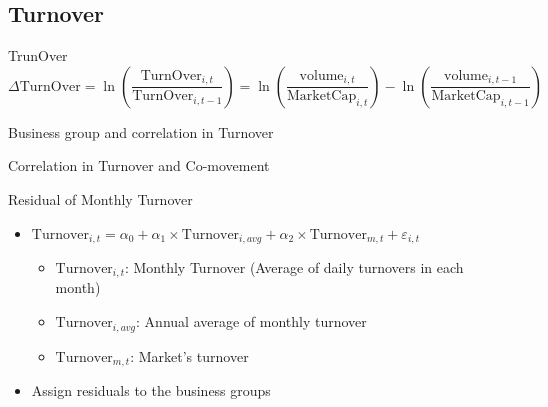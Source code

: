 \documentclass[handout]{beamer}
\begin{document}
 \subsection{Turnover}
	\begin{frame}{TrunOver}{\cite{Liquidity2016}}
		\begin{equation*}
			\Delta \text{TurnOver} = \ln(\frac{\text{TurnOver}_{i,t}}{\text{TurnOver}_{i,t-1}}) = 
			\ln({\frac{\text{volume}_{i,t}}{\text{MarketCap}_{i,t}}}) - \ln({\frac{\text{volume}_{i,t-1}}{\text{MarketCap}_{i,t-1}}})
		\end{equation*}


	\begin{table}[htbp]
		\centering
		\resizebox{0.55\textwidth}{!}{
			
		}
	\end{table}
	
\end{frame}


\begin{frame}{Business group and correlation in Turnover}
	\begin{table}[htbp]
		\centering
		\resizebox{\textwidth}{!}{
			\centering
			
		}
	\end{table}
\end{frame}

\begin{frame}{Correlation in Turnover and Co-movement}
\begin{table}[htbp]
	\centering
	\resizebox{\textwidth}{!}{
		\centering
		
	}
\end{table}
\end{frame}

\begin{frame}{Residual of Monthly Turnover}
\begin{itemize}
\item $ \text{Turnover}_{i,t} = \alpha_0 +\alpha_1 \times \text{Turnover}_{i,avg} +\alpha_2 \times \text{Turnover}_{m,t} + \boxed{\varepsilon_{i,t}} $
\begin{itemize}\scriptsize
\item $ \text{Turnover}_{i,t}$: Monthly Turnover (Average of daily turnovers in each month)
\item $ \text{Turnover}_{i,avg}$: Annual average of monthly turnover
\item $ \text{Turnover}_{m,t}$: Market's turnover 

\end{itemize}
\item Assign residuals to the business groups
\bigskip

	\begin{table}[htbp]
		\centering
		\resizebox{0.75\textwidth}{!}{
			
		}
		\label{tab:ResidualTrunSummary}
	\end{table}
\end{itemize}
\end{frame}
\end{document}
